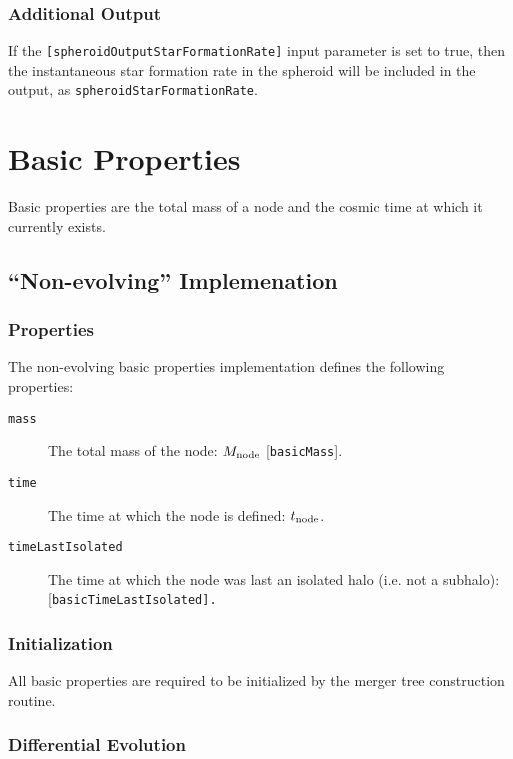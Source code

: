 \subsubsection{Additional Output}

If the {\tt [spheroidOutputStarFormationRate]} input parameter is set to true, then the instantaneous star formation rate in the spheroid will be included in the output, as {\tt spheroidStarFormationRate}.

\section{Basic Properties}\label{sec:ComponentBasicProperties}

Basic properties are the total mass of a \gls{node} and the cosmic time at which it currently exists.

\subsection{``Non-evolving'' Implemenation}

\subsubsection{Properties}

The non-evolving basic properties implementation defines the following properties:
\begin{description}
 \item [{\tt mass}] The total mass of the node: $M_{\rm node}$ [{\tt basicMass}].
 \item [{\tt time}] The time at which the \gls{node} is defined: $t_{\rm node}$.
 \item [{\tt timeLastIsolated}] The time at which the \gls{node} was last an isolated halo (i.e. not a subhalo): [\tt basicTimeLastIsolated].
\end{description}

\subsubsection{Initialization}

All basic properties are required to be initialized by the merger tree construction routine.

\subsubsection{Differential Evolution}

